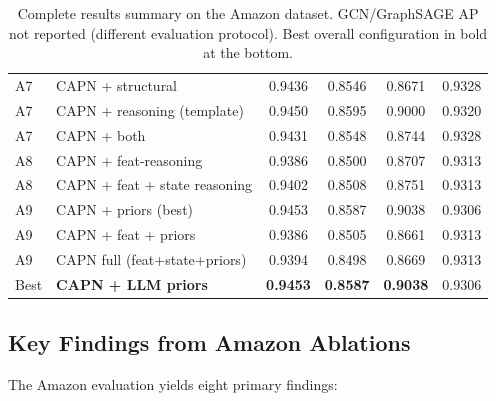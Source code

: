 \begin{table}[h!]
\begin{tabular}{llcccc}
A7 & CAPN + structural                & 0.9436 & 0.8546 & 0.8671 & 0.9328 \\
A7 & CAPN + reasoning (template)      & 0.9450 & 0.8595 & 0.9000 & 0.9320 \\
A7 & CAPN + both                      & 0.9431 & 0.8548 & 0.8744 & 0.9328 \\
\midrule
A8 & CAPN + feat-reasoning            & 0.9386 & 0.8500 & 0.8707 & 0.9313 \\
A8 & CAPN + feat + state reasoning    & 0.9402 & 0.8508 & 0.8751 & 0.9313 \\
\midrule
A9 & CAPN + priors (best)             & 0.9453 & 0.8587 & 0.9038 & 0.9306 \\
A9 & CAPN + feat + priors             & 0.9386 & 0.8505 & 0.8661 & 0.9313 \\
A9 & CAPN full (feat+state+priors)    & 0.9394 & 0.8498 & 0.8669 & 0.9313 \\
\midrule
Best & \textbf{CAPN + LLM priors}     & \textbf{0.9453} & \textbf{0.8587} & \textbf{0.9038} & 0.9306 \\
\bottomrule
\end{tabular}
\caption{Complete results summary on the Amazon dataset. GCN/GraphSAGE AP not reported (different evaluation protocol). Best overall configuration in bold at the bottom.}
\label{tab:full-summary}
\end{table}

\subsection{Key Findings from Amazon Ablations}
\label{sec:amazon-key-findings}

The Amazon evaluation yields eight primary findings:

